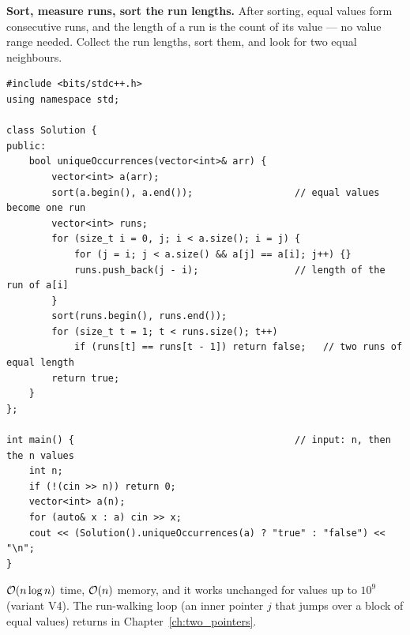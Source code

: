 \begin{alternativebox}
\textbf{Sort, measure runs, sort the run lengths.} After sorting, equal values form consecutive runs, and the length of a run is the count of its value --- no value range needed. Collect the run lengths, sort them, and look for two equal neighbours.
\begin{lstlisting}[style=cpp]
#include <bits/stdc++.h>
using namespace std;

class Solution {
public:
    bool uniqueOccurrences(vector<int>& arr) {
        vector<int> a(arr);
        sort(a.begin(), a.end());                  // equal values become one run
        vector<int> runs;
        for (size_t i = 0, j; i < a.size(); i = j) {
            for (j = i; j < a.size() && a[j] == a[i]; j++) {}
            runs.push_back(j - i);                 // length of the run of a[i]
        }
        sort(runs.begin(), runs.end());
        for (size_t t = 1; t < runs.size(); t++)
            if (runs[t] == runs[t - 1]) return false;   // two runs of equal length
        return true;
    }
};

int main() {                                       // input: n, then the n values
    int n;
    if (!(cin >> n)) return 0;
    vector<int> a(n);
    for (auto& x : a) cin >> x;
    cout << (Solution().uniqueOccurrences(a) ? "true" : "false") << "\n";
}
\end{lstlisting}
$\mathcal{O}(n \log n)$ time, $\mathcal{O}(n)$ memory, and it works unchanged for values up to $10^9$ (variant V4). The run-walking loop (an inner pointer $j$ that jumps over a block of equal values) returns in Chapter~\ref{ch:two_pointers}.

\begin{diagrambox}
\end{diagrambox}
\end{alternativebox}

